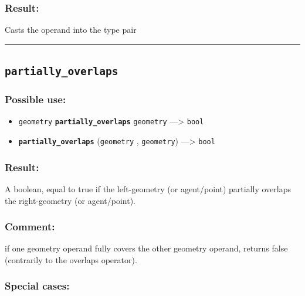 \documentclass[]{book}
\providecommand{\tightlist}{%
  \setlength{\itemsep}{0pt}\setlength{\parskip}{0pt}}
\theoremstyle{definition}
\theoremstyle{definition}
\theoremstyle{definition}
\theoremstyle{remark}
\begin{document}
\subsubsection{Result:}\label{result-378}

Casts the operand into the type pair

\begin{center}\rule{0.5\linewidth}{\linethickness}\end{center}

\subsection{\texorpdfstring{\texttt{partially\_overlaps}}{partially\_overlaps}}\label{partially_overlaps}

\subsubsection{Possible use:}\label{possible-use-393}

\begin{itemize}
\tightlist
\item
  \texttt{geometry} \textbf{\texttt{partially\_overlaps}}
  \texttt{geometry} ---\textgreater{} \texttt{bool}
\item
  \textbf{\texttt{partially\_overlaps}} (\texttt{geometry} ,
  \texttt{geometry}) ---\textgreater{} \texttt{bool}
\end{itemize}

\subsubsection{Result:}\label{result-379}

A boolean, equal to true if the left-geometry (or agent/point) partially
overlaps the right-geometry (or agent/point).

\subsubsection{Comment:}\label{comment-77}

if one geometry operand fully covers the other geometry operand, returns
false (contrarily to the overlaps operator).

\subsubsection{Special cases:}\label{special-cases-109}
\end{document}
